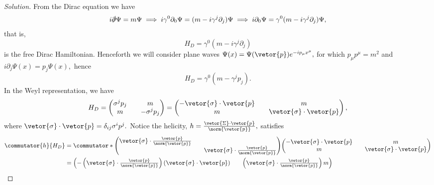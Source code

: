 \begin{proof}[Solution]
   From the Dirac equation we have
   \begin{equation*}
      i\slashed{\partial}\Psi = m \Psi \implies i \gamma^0\partial_0 \Psi = (m - i \gamma^j \partial_j)\Psi \implies i \partial_0 \Psi = \gamma^0 (m - i \gamma^j \partial_j) \Psi,
   \end{equation*}
   that is,
   \begin{equation*}
       H_D = \gamma^0 (m - i \gamma^j \partial_j)
   \end{equation*}
   is the free Dirac Hamiltonian. Henceforth we will consider plane waves \(\Psi(x) = \Psi(\vetor{p}) e^{- i p_\mu x^\mu},\) for which \(p_\mu p^\mu = m^2\) and \(i\partial_j\Psi(x) = p_j \Psi(x),\) hence
   \begin{equation*}
      H_D = \gamma^0 (m - \gamma^j p_j).
   \end{equation*}
   In the Weyl representation, we have
   \begin{equation*}
      H_D = \begin{pmatrix}
         \sigma^j p_j && m\\
         m && -\sigma^j p_j
         \end{pmatrix} = \begin{pmatrix}
         -\vetor{\sigma} \cdot \vetor{p} && m\\
         m && \vetor{\sigma} \cdot \vetor{p}
      \end{pmatrix},
   \end{equation*}
   where \(\vetor{\sigma} \cdot \vetor{p} = \delta_{ij} \sigma^i p^j.\) Notice the helicity, \(h = \frac{\vetor{\Sigma} \cdot \vetor{p}}{\norm{\vetor{p}}},\) satisfies
   \begin{align*}
      \commutator{h}{H_D} 
      &= \commutator*{\begin{pmatrix}
            \vetor{\sigma} \cdot \frac{\vetor{p}}{\norm{\vetor{p}}} &&\\
                                                                    && \vetor{\sigma} \cdot \frac{\vetor{p}}{\norm{\vetor{p}}}
      \end{pmatrix}}
      {\begin{pmatrix}
            -\vetor{\sigma} \cdot \vetor{p} && m\\
            m && \vetor{\sigma} \cdot \vetor{p}
      \end{pmatrix}}\\
      &=
      \begin{pmatrix}
         -\left(\vetor{\sigma}\cdot\frac{\vetor{p}}{\norm{\vetor{p}}}\right)(\vetor{\sigma}\cdot \vetor{p}) && \left(\vetor{\sigma}\cdot\frac{\vetor{p}}{\norm{\vetor{p}}}\right)m\\

\end{pmatrix}
\end{align*}
\end{proof}
